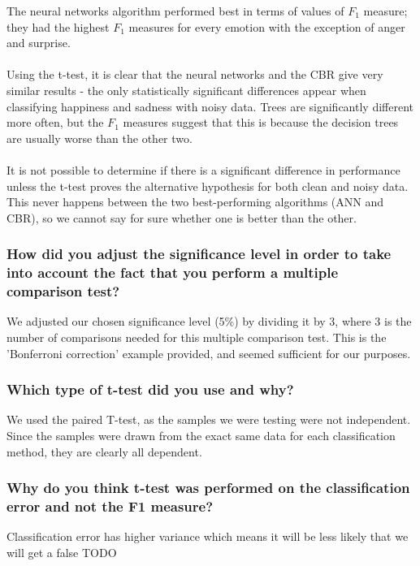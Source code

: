 \documentclass[12pt]{article}
\begin{document}
The neural networks algorithm performed best in terms of values of $F_1$ measure; they had the highest $F_1$ measures for every emotion with the exception of anger and surprise. \\ \\
Using the t-test, it is clear that the neural networks and the CBR give very similar results - the only statistically significant differences appear when classifying happiness and sadness with noisy data. Trees are significantly different more often, but the $F_1$ measures suggest that this is because the decision trees are usually worse than the other two. \\ \\
It is not possible to determine if there is a significant difference in performance unless the t-test proves the alternative hypothesis for both clean and noisy data. This never happens between the two best-performing algorithms (ANN and CBR), so we cannot say for sure whether one is better than the other.

\subsubsection*{How did you adjust the significance level in order to take into account the fact that you perform a multiple comparison test?}

We adjusted our chosen significance level (5\%) by dividing it by 3, where 3 is the number of comparisons needed for this multiple comparison test. This is the 'Bonferroni correction' example provided, and seemed sufficient for our purposes.

\subsubsection*{Which type of t-test did you use and why?}

We used the paired T-test, as the samples we were testing were not independent. Since the samples were drawn from the exact same data for each classification method, they are clearly all dependent.

\subsubsection*{Why do you think t-test was performed on the classification error and not the F1 measure?}

Classification error has higher variance which means it will be less likely that we will get a false TODO
\end{document}
